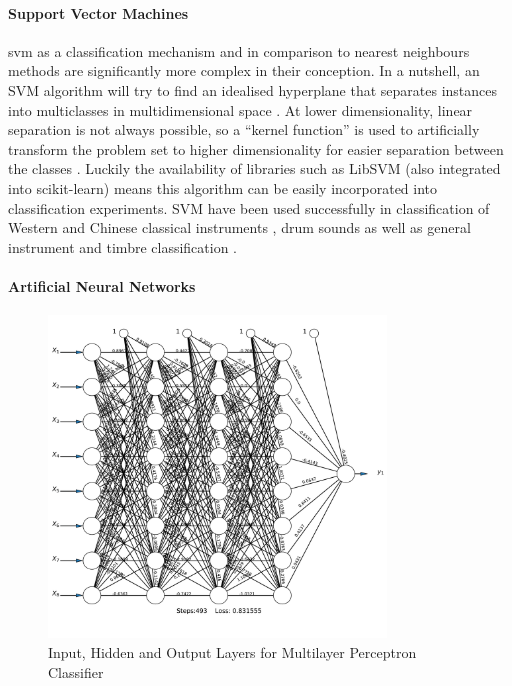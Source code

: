 {{{{\paragraph{Support Vector Machines} 

\acrfull{svm} as a classification mechanism and in comparison to nearest neighbours methods are significantly more complex in their conception. In a nutshell, an SVM algorithm will try to find an idealised hyperplane that separates instances into multiclasses in multidimensional space \citep{Chang2008}. At lower dimensionality, linear separation is not always possible, so a ``kernel function'' is used to artificially transform the problem set to higher dimensionality for easier separation between the classes \citep{Xu2003}. Luckily the availability of libraries such as LibSVM \citep{Chang2011} (also integrated into scikit-learn) means this algorithm can be easily incorporated into classification experiments. SVM have been used successfully in classification of Western and Chinese classical instruments \citep{Liu2010a}, drum sounds \citep{Herrera2002, Herrera2003} as well as general instrument and timbre classification \citep{Herrera-Boyer2003, Krey2010, Agostini2003, Deng2008}.

\paragraph{Artificial Neural Networks}

\begin{figure}
	\begin{center}
		\includegraphics[width=0.8\textwidth]{ch05_pyconcat/figures/neural_network.pdf}
	\end{center}
	\caption[Input, Hidden and Output Layers for Multilayer Perceptron Classifier]{Input, Hidden and Output Layers for Multilayer Perceptron Classifier}
	\label{fig:neural_net}
\end{figure}

}}}}
